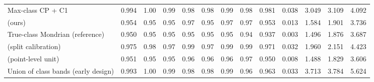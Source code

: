\begin{table}[!htbp]
{\begin{tabular}{lcccccccccccc}
Max-class CP + C1 & 0.994 & 1.00 & 0.99 & 0.98 & 0.98 & 0.99 & 0.98 & 0.981 & 0.038 & 3.049 & 3.109 & 4.092 \\
\gamut{} (ours) & 0.954 & 0.95 & 0.95 & 0.97 & 0.95 & 0.97 & 0.97 & 0.953 & 0.013 & 1.584 & 1.901 & 3.736 \\
True-class Mondrian (reference) & 0.950 & 0.95 & 0.95 & 0.95 & 0.95 & 0.95 & 0.94 & 0.937 & 0.003 & 1.496 & 1.876 & 3.687 \\
\gamut{} (split calibration) & 0.975 & 0.98 & 0.97 & 0.99 & 0.97 & 0.99 & 0.99 & 0.971 & 0.032 & 1.960 & 2.151 & 4.423 \\
\gamut{} (point-level unit) & 0.951 & 0.95 & 0.95 & 0.96 & 0.96 & 0.96 & 0.97 & 0.950 & 0.008 & 1.488 & 1.829 & 3.606 \\
Union of class bands (early design) & 0.993 & 1.00 & 0.99 & 0.98 & 0.98 & 0.99 & 0.96 & 0.963 & 0.033 & 3.713 & 3.784 & 5.624 \\
\bottomrule
\end{tabular}}
\end{table}
\FloatBarrier
